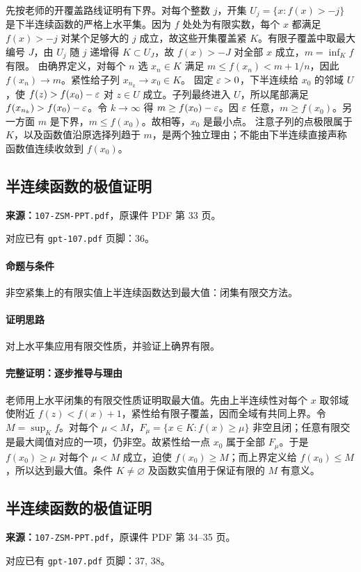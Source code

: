 先按老师的开覆盖路线证明有下界。对每个整数 $j$，开集 $U_j=\{x:f(x)>-j\}$ 是下半连续函数的严格上水平集。因为 $f$ 处处为有限实数，每个 $x$ 都满足 $f(x)>-j$ 对某个足够大的 $j$ 成立，故这些开集覆盖紧 $K$。有限子覆盖中取最大编号 $J$，由 $U_j$ 随 $j$ 递增得 $K\subset U_J$，故 $f(x)>-J$ 对全部 $x$ 成立，$m=\inf_K f$ 有限。
由确界定义，对每个 $n$ 选 $x_n\in K$ 满足 $m\le f(x_n)<m+1/n$，因此 $f(x_n)\to m$。紧性给子列 $x_{n_k}\to x_0\in K$。
固定 $\varepsilon>0$，下半连续给 $x_0$ 的邻域 $U$，使 $f(z)>f(x_0)-\varepsilon$ 对 $z\in U$ 成立。子列最终进入 $U$，所以尾部满足 $f(x_{n_k})>f(x_0)-\varepsilon$。令 $k\to\infty$ 得 $m\ge f(x_0)-\varepsilon$。因 $\varepsilon$ 任意，$m\ge f(x_0)$。另一方面 $m$ 是下界，$m\le f(x_0)$。故相等，$x_0$ 是最小点。
注意子列的点极限属于 $K$，以及函数值沿原选择列趋于 $m$，是两个独立理由；不能由下半连续直接声称函数值连续收敛到 $f(x_0)$。

\clearpage\subsection{半连续函数的极值证明}
\textbf{来源：}\texttt{107-ZSM-PPT.pdf}，原课件 PDF 第 33 页。\par
对应已有 \texttt{gpt-107.pdf} 页脚：36。\par
\paragraph{命题与条件}非空紧集上的有限实值上半连续函数达到最大值：闭集有限交方法。
\paragraph{证明思路}对上水平集应用有限交性质，并验证上确界有限。
\paragraph{完整证明：逐步推导与理由}
老师用上水平闭集的有限交性质证明取最大值。先由上半连续性对每个 $x$ 取邻域使附近 $f(z)<f(x)+1$，紧性给有限子覆盖，因而全域有共同上界。令 $M=\sup_K f$。对每个 $\mu<M$，$F_\mu=\{x\in K:f(x)\ge\mu\}$ 非空且闭；任意有限交是最大阈值对应的一项，仍非空。故紧性给一点 $x_0$ 属于全部 $F_\mu$。于是 $f(x_0)\ge\mu$ 对每个 $\mu<M$ 成立，迫使 $f(x_0)\ge M$；而上界定义给 $f(x_0)\le M$，所以达到最大值。条件 $K\ne\varnothing$ 及函数实值用于保证有限的 $M$ 有意义。
\clearpage\subsection{半连续函数的极值证明}
\textbf{来源：}\texttt{107-ZSM-PPT.pdf}，原课件 PDF 第 34--35 页。\par
对应已有 \texttt{gpt-107.pdf} 页脚：37, 38。\par
